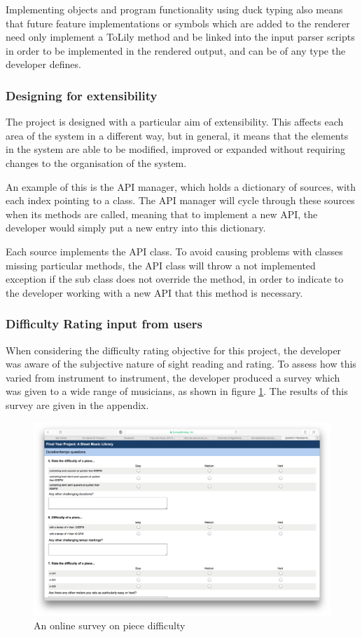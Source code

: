 Implementing objects and program functionality using duck typing also means that future feature implementations or symbols which are added to the renderer need only implement a ToLily method and be linked into the input parser scripts in order to be implemented in the rendered output, and can be of any type the developer defines.

\subsubsection{Designing for extensibility}
The project is designed with a particular aim of extensibility. This affects each area of the system in a different way, but in general, it means that the elements in the system are able to be modified, improved or expanded without requiring changes to the organisation of the system. 

An example of this is the API manager, which holds a dictionary of sources, with each index pointing to a class. The API manager will cycle through these sources when its methods are called, meaning that to implement a new API, the developer would simply put a new entry into this dictionary.

Each source implements the API class. To avoid causing problems with classes missing particular methods, the API class will throw a not implemented exception if the sub class does not override the method, in order to indicate to the developer working with a new API that this method is necessary.

\subsubsection{Difficulty Rating input from users}
When considering the difficulty rating objective for this project, the developer was aware of the subjective nature of sight reading and rating. To assess how this varied from instrument to instrument, the developer produced a survey which was given to a wide range of musicians, as shown in figure \ref{fig:survey_difficulty}. The results of this survey are given in the appendix.

\begin{figure}[H]
\centering
\includegraphics[width=400pt]{survey_difficulty}
\caption{An online survey on piece difficulty}
\label{fig:survey_difficulty}	
\end{figure}




